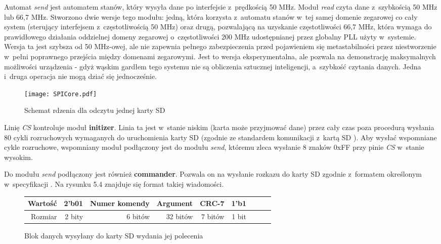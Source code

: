 Automat \textit{send} jest automatem stanów, który wysyła dane po interfejsie z~prędkością 50 MHz. Moduł \textit{read} czyta dane z~szybkością 50 MHz lub 66,7 MHz. Stworzono dwie wersje tego modułu: jedną, która korzysta z~automatu stanów w~tej samej domenie zegarowej co cały system (sterujący interfejsem z~częstotliwością 50 MHz) oraz drugą, pozwalającą na uzyskanie częstotliwości 66,7 MHz, która wymaga do prawidłowego działania oddzielnej domeny zegarowej o~częstotliwości 200 MHz udostępnianej przez globalny PLL użyty w~systemie. Wersja ta jest szybsza od 50 MHz-owej, ale nie zapewnia pełnego zabezpieczenia przed pojawieniem się metastabilności przez niestworzenie w~pełni poprawnego przejścia między domenami zegarowymi. Jest to wersja eksperymentalna, ale pozwala na demonstrację maksymalnych możliwości urządzenia - gdyż wąskim gardłem tego systemu nie są obliczenia sztucznej inteligencji, a~szybkość czytania danych. Jedna i~druga operacja nie mogą dziać się jednocześnie.

\begin{figure}[h]
	\centering
	\texttt{[image: SPICore.pdf]}
	\caption{Schemat rdzenia dla odczytu jednej karty SD}
\end{figure}
\FloatBarrier %

Linię \textit{CS} kontroluje moduł \textbf{initizer}. Linia ta jest w~stanie niskim (karta może przyjmować dane) przez cały czas poza procedurą wysłania 80 cykli rozruchowych wymaganych do uruchomienia karty SD (zgodnie ze standardem komunikacji z~kartą SD \cite{SDA}). Aby wysłać wspomniane cykle rozruchowe, wspomniany moduł podłączony jest do modułu \textit{send}, któremu zleca wysłanie 8 znaków 0xFF przy pinie \textit{CS} w~stanie wysokim.

Do modułu \textit{send} podłączony jest również \textbf{commander}. Pozwala on na wysłanie rozkazu do karty SD zgodnie z~formatem określonym w~specyfikacji \cite{SDA}. Na rysunku 5.4 znajduje się format takiej wiadomości.

\begin{figure}[h]
	\centering
	\begin{tabular}{|r|r|r|r|r|r|r|r|r|}
		\hline
		Wartość & 2'b01 & Numer komendy & Argument & CRC-7 & 1'b1 \\
		\hline
		Rozmiar & 2 bity & 6 bitów & 32 bitów & 7 bitów & 1 bit \\
		\hline
	\end{tabular}
	
	\caption{Blok danych wysyłany do karty SD wydania jej polecenia}
\end{figure}


